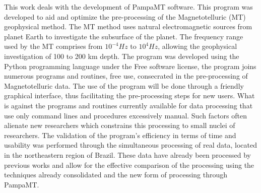 \documentclass[12pt,twoside,oneright,a4paper,chapter=TITLE,english,brazil]{unipampa}
\begin{document}
\begin{resumo}
\end{resumo}


\begin{resumoingles}
This work deals with the development of PampaMT software. This program was developed to aid and optimize the pre-processing of the Magnetotelluric (MT) geophysical method. The MT method uses natural electromagnetic sources from planet Earth to investigate the subsurface of the planet. The frequency range used by the MT comprises from $10^{-4} Hz$ to $10^{4} Hz$, allowing the geophysical investigation of 100 to 200 km depth. The program was developed using the Python programming language under the Free software license, the program joins numerous programs and routines, free use, consecrated in the pre-processing of Magnetotelluric data. The use of the program will be done through a friendly graphical interface, thus facilitating the pre-processing steps for new users. What is against the programs and routines currently available for data processing that use only command lines and procedures excessively manual. Such factors often alienate new researchers which constrains this processing to small nuclei of researchers. The validation of the program's efficiency in terms of time and usability was performed through the simultaneous processing of real data, located in the northeastern region of Brazil. These data have already been processed by previous works and allow for the effective comparison of the processing using the techniques already consolidated and the new form of processing through PampaMT.
\end{resumoingles}


\listoffigures      %
\end{document}

